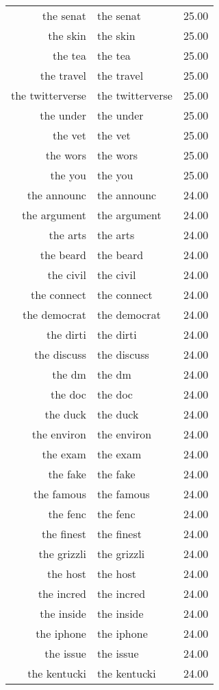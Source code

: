 \begin{table}[ht]
\begin{tabular}{rlr}
  the senat & the senat & 25.00 \\ 
  the skin & the skin & 25.00 \\ 
  the tea & the tea & 25.00 \\ 
  the travel & the travel & 25.00 \\ 
  the twitterverse & the twitterverse & 25.00 \\ 
  the under & the under & 25.00 \\ 
  the vet & the vet & 25.00 \\ 
  the wors & the wors & 25.00 \\ 
  the you & the you & 25.00 \\ 
  the announc & the announc & 24.00 \\ 
  the argument & the argument & 24.00 \\ 
  the arts & the arts & 24.00 \\ 
  the beard & the beard & 24.00 \\ 
  the civil & the civil & 24.00 \\ 
  the connect & the connect & 24.00 \\ 
  the democrat & the democrat & 24.00 \\ 
  the dirti & the dirti & 24.00 \\ 
  the discuss & the discuss & 24.00 \\ 
  the dm & the dm & 24.00 \\ 
  the doc & the doc & 24.00 \\ 
  the duck & the duck & 24.00 \\ 
  the environ & the environ & 24.00 \\ 
  the exam & the exam & 24.00 \\ 
  the fake & the fake & 24.00 \\ 
  the famous & the famous & 24.00 \\ 
  the fenc & the fenc & 24.00 \\ 
  the finest & the finest & 24.00 \\ 
  the grizzli & the grizzli & 24.00 \\ 
  the host & the host & 24.00 \\ 
  the incred & the incred & 24.00 \\ 
  the inside & the inside & 24.00 \\ 
  the iphone & the iphone & 24.00 \\ 
  the issue & the issue & 24.00 \\ 
  the kentucki & the kentucki & 24.00 \\ 

\end{tabular}
\end{table}
